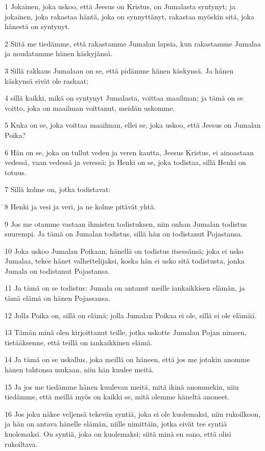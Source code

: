 \par 1 Jokainen, joka uskoo, että Jeesus on Kristus, on Jumalasta syntynyt; ja jokainen, joka rakastaa häntä, joka on synnyttänyt, rakastaa myöskin sitä, joka hänestä on syntynyt.
\par 2 Siitä me tiedämme, että rakastamme Jumalan lapsia, kun rakastamme Jumalaa ja noudatamme hänen käskyjänsä.
\par 3 Sillä rakkaus Jumalaan on se, että pidämme hänen käskynsä. Ja hänen käskynsä eivät ole raskaat;
\par 4 sillä kaikki, mikä on syntynyt Jumalasta, voittaa maailman; ja tämä on se voitto, joka on maailman voittanut, meidän uskomme.
\par 5 Kuka on se, joka voittaa maailman, ellei se, joka uskoo, että Jeesus on Jumalan Poika?
\par 6 Hän on se, joka on tullut veden ja veren kautta, Jeesus Kristus, ei ainoastaan vedessä, vaan vedessä ja veressä; ja Henki on se, joka todistaa, sillä Henki on totuus.
\par 7 Sillä kolme on, jotka todistavat:
\par 8 Henki ja vesi ja veri, ja ne kolme pitävät yhtä.
\par 9 Jos me otamme vastaan ihmisten todistuksen, niin onhan Jumalan todistus suurempi. Ja tämä on Jumalan todistus, sillä hän on todistanut Pojastansa.
\par 10 Joka uskoo Jumalan Poikaan, hänellä on todistus itsessänsä; joka ei usko Jumalaa, tekee hänet valhettelijaksi, koska hän ei usko sitä todistusta, jonka Jumala on todistanut Pojastansa.
\par 11 Ja tämä on se todistus: Jumala on antanut meille iankaikkisen elämän, ja tämä elämä on hänen Pojassansa.
\par 12 Jolla Poika on, sillä on elämä; jolla Jumalan Poikaa ei ole, sillä ei ole elämää.
\par 13 Tämän minä olen kirjoittanut teille, jotka uskotte Jumalan Pojan nimeen, tietääksenne, että teillä on iankaikkinen elämä.
\par 14 Ja tämä on se uskallus, joka meillä on häneen, että jos me jotakin anomme hänen tahtonsa mukaan, niin hän kuulee meitä.
\par 15 Ja jos me tiedämme hänen kuulevan meitä, mitä ikinä anommekin, niin tiedämme, että meillä myös on kaikki se, mitä olemme häneltä anoneet.
\par 16 Jos joku näkee veljensä tekevän syntiä, joka ei ole kuolemaksi, niin rukoilkoon, ja hän on antava hänelle elämän, niille nimittäin, jotka eivät tee syntiä kuolemaksi. On syntiä, joka on kuolemaksi; siitä minä en sano, että olisi rukoiltava.
